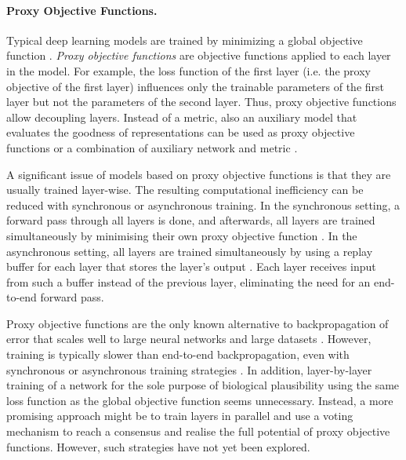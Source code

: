 \paragraph{Proxy Objective Functions.} Typical deep learning models are trained by minimizing a global objective function \cite{prince_understanding_2023}. \emph{Proxy objective functions}  are objective functions applied to each layer in the model. For example, the loss function of the first layer (i.e. the proxy objective of the first layer) influences only the trainable parameters of the first layer but not the parameters of the second layer.
Thus, proxy objective functions allow decoupling layers.
Instead of a metric, also an auxiliary model that evaluates the goodness of representations can be used as proxy objective functions \cite{duan_kernel_2020, duan_modularizing_2022, wang_revisiting_2021, belilovsky_greedy_2019, mostafa_deep_2018, marquez_deep_2018} or a combination of auxiliary network and metric .

A significant issue of models based on proxy objective functions is that they are usually trained layer-wise.
The resulting computational inefficiency can be reduced with synchronous or asynchronous training.
In the synchronous setting, a forward pass through all layers is done, and afterwards, all layers are trained simultaneously by minimising their own proxy objective function \cite{belilovsky_greedy_2019}.
In the asynchronous setting, all layers are trained simultaneously by using a replay buffer for each layer that stores the layer's output .
Each layer receives input from such a buffer instead of the previous layer, eliminating the need for an end-to-end forward pass.

Proxy objective functions are the only known alternative to backpropagation of error that scales well to large neural networks and large datasets .
However, training is typically slower than end-to-end backpropagation, even with synchronous or asynchronous training strategies  \cite{belilovsky_decoupled_2020}.
In addition, layer-by-layer training of a network for the sole purpose of biological plausibility using the same loss function as the global objective function seems unnecessary. Instead, a more promising approach might be to train layers in parallel and use a voting mechanism to reach a consensus and realise the full potential of proxy objective functions. However, such strategies have not yet been explored.

